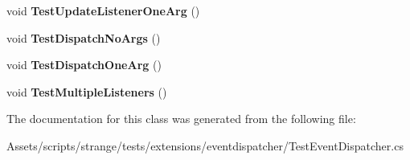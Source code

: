 \begin{DoxyCompactItemize}
\item 
\hypertarget{classstrange_1_1unittests_1_1_test_event_dispatcher_a342ad80e97e4464d541cbf2164c7f074}{void {\bfseries Test\-Update\-Listener\-One\-Arg} ()}\label{classstrange_1_1unittests_1_1_test_event_dispatcher_a342ad80e97e4464d541cbf2164c7f074}

\item 
\hypertarget{classstrange_1_1unittests_1_1_test_event_dispatcher_a8b6f8d5c4d31735968e996c02d252fa1}{void {\bfseries Test\-Dispatch\-No\-Args} ()}\label{classstrange_1_1unittests_1_1_test_event_dispatcher_a8b6f8d5c4d31735968e996c02d252fa1}

\item 
\hypertarget{classstrange_1_1unittests_1_1_test_event_dispatcher_a0a693bdc2d916defa5d9db3a7599a44c}{void {\bfseries Test\-Dispatch\-One\-Arg} ()}\label{classstrange_1_1unittests_1_1_test_event_dispatcher_a0a693bdc2d916defa5d9db3a7599a44c}

\item 
\hypertarget{classstrange_1_1unittests_1_1_test_event_dispatcher_a8a3693e10560c5f273a9a9609a8073be}{void {\bfseries Test\-Multiple\-Listeners} ()}\label{classstrange_1_1unittests_1_1_test_event_dispatcher_a8a3693e10560c5f273a9a9609a8073be}

\end{DoxyCompactItemize}


The documentation for this class was generated from the following file\-:\begin{DoxyCompactItemize}
\item 
Assets/scripts/strange/tests/extensions/eventdispatcher/Test\-Event\-Dispatcher.\-cs\end{DoxyCompactItemize}
